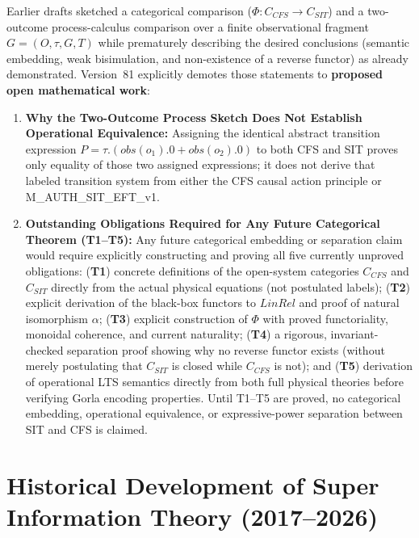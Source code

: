 \documentclass[american,11pt,letterpaper]{article}
\def\mathcal#1{#1}%
\def\mathrm#1{#1}%
\def\texttt#1{#1}%
\def\emph#1{#1}%
\begin{document}
Earlier drafts sketched a categorical comparison ($\Phi : \mathcal{C}_{\mathrm{CFS}} \to \mathcal{C}_{\mathrm{SIT}}$) and a two-outcome process-calculus comparison over a finite observational fragment $G = (O, \tau, \mathcal{G}, \mathcal{T})$ while prematurely describing the desired conclusions (semantic embedding, weak bisimulation, and non-existence of a reverse functor) as already demonstrated. Version~81 explicitly demotes those statements to \textbf{proposed open mathematical work}:
\begin{enumerate}[leftmargin=2em]
  \item \textbf{Why the Two-Outcome Process Sketch Does Not Establish Operational Equivalence:} Assigning the identical abstract transition expression $P = \tau.(\mathrm{obs}(o_1).0 + \mathrm{obs}(o_2).0)$ to both CFS and SIT proves only equality of those two assigned expressions; it does \emph{not} derive that labeled transition system from either the CFS causal action principle or \texttt{M\_AUTH\_SIT\_EFT\_v1}.
  \item \textbf{Outstanding Obligations Required for Any Future Categorical Theorem (T1--T5):} Any future categorical embedding or separation claim would require explicitly constructing and proving all five currently unproved obligations: (\textbf{T1}) concrete definitions of the open-system categories $\mathcal{C}_{\mathrm{CFS}}$ and $\mathcal{C}_{\mathrm{SIT}}$ directly from the actual physical equations (not postulated labels); (\textbf{T2}) explicit derivation of the black-box functors to $\mathrm{LinRel}$ and proof of natural isomorphism $\alpha$; (\textbf{T3}) explicit construction of $\Phi$ with proved functoriality, monoidal coherence, and current naturality; (\textbf{T4}) a rigorous, invariant-checked separation proof showing why no reverse functor exists (without merely postulating that $\mathcal{C}_{\mathrm{SIT}}$ is closed while $\mathcal{C}_{\mathrm{CFS}}$ is not); and (\textbf{T5}) derivation of operational LTS semantics directly from both full physical theories before verifying Gorla encoding properties. Until T1--T5 are proved, no categorical embedding, operational equivalence, or expressive-power separation between SIT and CFS is claimed.
\end{enumerate}



\section{Historical Development of Super Information Theory (2017--2026)}
\label{app:historical-development}
\end{document}
